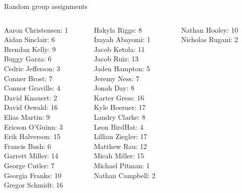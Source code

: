 \documentclass[10pt]{beamer}
\begin{document}
\begin{frame}{Random group assignments}
\footnotesize 
\vfill 
\begin{columns}
\begin{column}{0.33\textwidth}
Aaron Christensen: 1 \\ 
Aidan Sinclair: 6 \\ 
Brendan Kelly: 9 \\ 
Buggy Garza: 6 \\ 
Cedric Jefferson: 3 \\ 
Conner Brost: 7 \\ 
Connor Graville: 4 \\ 
David Knauert: 2 \\ 
David Oswald: 16 \\ 
Elias Martin: 9 \\ 
Ericson O'Guinn: 3 \\ 
Erik Halverson: 15 \\ 
Francis Bush: 6 \\ 
Garrett Miller: 14 \\ 
George Cutler: 7 \\ 
Georgia Franks: 10 \\ 
Gregor Schmidt: 16 \\\end{column}
\begin{column}{0.33\textwidth}
Hakyla Riggs: 8 \\ 
Izayah Abayomi: 1 \\ 
Jacob Ketola: 11 \\ 
Jacob Ruiz: 13 \\ 
Jaden Hampton: 5 \\ 
Jeremy Ness: 7 \\ 
Jonah Day: 8 \\ 
Karter Gress: 16 \\ 
Kyle Hoerner: 17 \\ 
Landry Clarke: 8 \\ 
Leon BirdHat: 4 \\ 
Lillian Ziegler: 17 \\ 
Matthew Rau: 12 \\ 
Micah Miller: 15 \\ 
Michael Pitman: 1 \\ 
Nathan Campbell: 2 \\\end{column}
\begin{column}{0.33\textwidth}
Nathan Hooley: 10 \\ 
Nicholas Rugani: 2 \\ 

\end{column}
\end{columns}
\end{frame}
\end{document}
